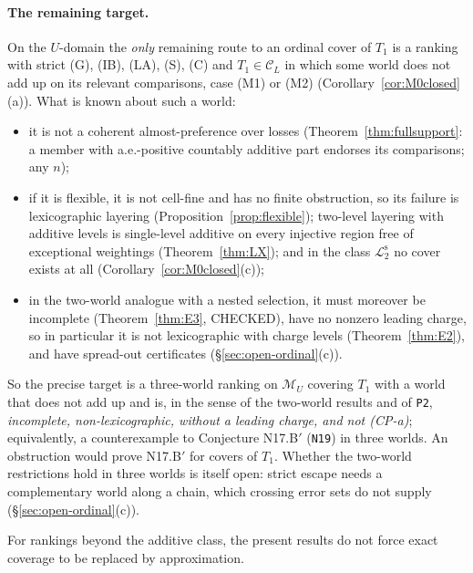\documentclass[11pt]{article}
\theoremstyle{definition}
\theoremstyle{remark}
\newcommand{\M}{\mathcal M}
\newcommand{\C}{\mathcal C}
\newcommand{\src}[1]{\texttt{#1}}
\newcommand{\Ltwo}{\mathcal L_2^{\mathrm s}}
\begin{document}
\paragraph{The remaining target.} On the $U$-domain the \emph{only} remaining route to an ordinal cover of $T_1$ is a ranking with strict (G), (IB), (LA), (S), (C) and $T_1\in\C_L$ in which some world does not add up on its relevant comparisons, case (M1) or (M2) (Corollary~\ref{cor:M0closed}(a)). What is known about such a world:
\begin{itemize}[leftmargin=*]
\item it is not a coherent almost-preference over losses (Theorem~\ref{thm:fullsupport}: a member with a.e.-positive countably additive part endorses its comparisons; any $n$);
\item if it is flexible, it is not cell-fine and has no finite obstruction, so its failure is lexicographic layering (Proposition~\ref{prop:flexible}); two-level layering with additive levels is single-level additive on every injective region free of exceptional weightings (Theorem~\ref{thm:LX}); and in the class $\Ltwo$ no cover exists at all (Corollary~\ref{cor:M0closed}(c));
\item in the two-world analogue with a nested selection, it must moreover be incomplete (Theorem~\ref{thm:E3}, CHECKED), have no nonzero leading charge, so in particular it is not lexicographic with charge levels (Theorem~\ref{thm:E2}), and have spread-out certificates (\S\ref{sec:open-ordinal}(c)).
\end{itemize}
So the precise target is a three-world ranking on $\M_U$ covering $T_1$ with a world that does not add up and is, in the sense of the two-world results and of \src{P2}, \emph{incomplete, non-lexicographic, without a leading charge, and not (CP-a)}; equivalently, a counterexample to Conjecture N17.B$'$ (\src{N19}) in three worlds. An obstruction would prove N17.B$'$ for covers of $T_1$. Whether the two-world restrictions hold in three worlds is itself open: strict escape needs a complementary world along a chain, which crossing error sets do not supply (\S\ref{sec:open-ordinal}(c)).

For rankings beyond the additive class, the present results do not force exact coverage to be replaced by approximation.
\end{document}
